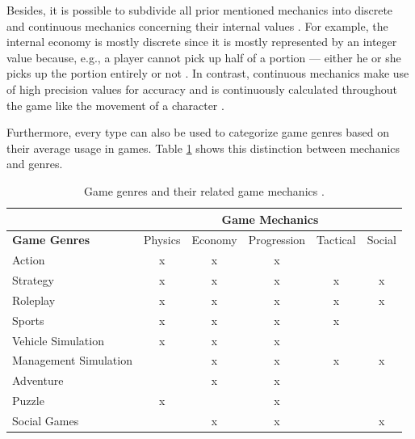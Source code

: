 \documentclass[MGS,Master,english]{twbook}%
\begin{document}
Besides, it is possible to subdivide all prior mentioned mechanics into discrete and continuous mechanics concerning their internal values \cite{gameDesign::gameMechanicsAdvancedGameDesign}. For example, the internal economy is mostly discrete since it is mostly represented by an integer value because, e.g., a player cannot pick up half of a portion — either he or she picks up the portion entirely or not \cite{gameDesign::gameMechanicsAdvancedGameDesign}. In contrast, continuous mechanics make use of high precision values for accuracy and is continuously calculated throughout the game like the movement of a character \cite{gameDesign::gameMechanicsAdvancedGameDesign}. 

Furthermore, every type can also be used to categorize game genres based on their average usage in games. Table \ref{GameMechanicsToGenre} shows this distinction between mechanics and genres.
\begin{table}[!ht]
	\centering
	{%
		\begin{tabular}{l||c|c|c|c|c|}
			\cline{2-6}
			& \multicolumn{5}{c|}{\textbf{Game Mechanics}}        \\ \hline 
			\multicolumn{1}{|l||}{\textbf{Game Genres}}  & Physics & Economy & Progression & Tactical & Social \\ \hline \hline
			\multicolumn{1}{|l||}{Action}                & x       & x       & x           &          &        \\ \hline
			\multicolumn{1}{|l||}{Strategy}              & x       & x       & x           & x        & x      \\ \hline
			\multicolumn{1}{|l||}{Roleplay}              & x       & x       & x           & x        & x      \\ \hline
			\multicolumn{1}{|l||}{Sports}                & x       & x       & x           & x        &        \\ \hline
			\multicolumn{1}{|l||}{Vehicle Simulation}    & x       & x       & x           &          &        \\ \hline
			\multicolumn{1}{|l||}{Management Simulation} &         & x       & x           & x        & x      \\ \hline
			\multicolumn{1}{|l||}{Adventure}             &         & x       & x           &          &        \\ \hline
			\multicolumn{1}{|l||}{Puzzle}                & x       &         & x           &          &        \\ \hline
			\multicolumn{1}{|l||}{Social Games}          &         & x       & x           &          & x      \\ \hline
		\end{tabular}%
	}
	\caption{Game genres and their related game mechanics \protect\cite{gameDesign::gameMechanicsAdvancedGameDesign}.}
	\label{GameMechanicsToGenre}
\end{table}
\end{document}
